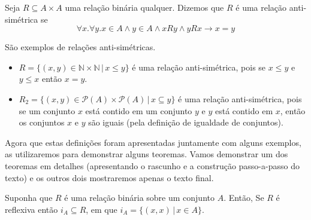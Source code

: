 \begin{Definition}
Seja $R\subseteq A \times A$ uma relação binária qualquer. Dizemos que
$R$ é uma relação anti-simétrica se
\[
\forall x.\forall y.  x \in A \land y \in A
\land xRy \land yRx \to x = y
\]
\end{Definition}

\begin{Example}
São exemplos de relações anti-simétricas.
\begin{itemize}
  \item $R = \{(x,y) \in \mathbb{N} \times \mathbb{N}\,|\, x \leq
    y\}$ é uma relação anti-simétrica, pois se $x \leq y$ e $y \leq x$
    então $x = y$.
  \item
    $R_2=\{(x,y)\in\mathcal{P}(A)\times\mathcal{P}(A)\,|\,x\subseteq
    y\}$ é uma relação anti-simétrica, pois se um
    conjunto $x$ está contido em um conjunto $y$ e $y$ está contido em
    $x$, então os conjuntos $x$ e $y$ são iguais (pela definição de
    igualdade de conjuntos).
\end{itemize}
\end{Example}
Agora que estas definições foram apresentadas juntamente com alguns
exemplos, as utilizaremos para demonstrar alguns teoremas. Vamos
demonstrar um dos teoremas em detalhes (apresentando o rascunho e a
construção passo-a-passo do texto) e os outros dois mostraremos apenas
o texto final.
\begin{Theorem}
Suponha que $R$ é uma relação binária sobre um conjunto $A$. Então,
Se $R$ é reflexiva então $i_A \subseteq R$, em que  $i_A=\{(x,x)\,|\,x \in A\}$.
\end{Theorem}
